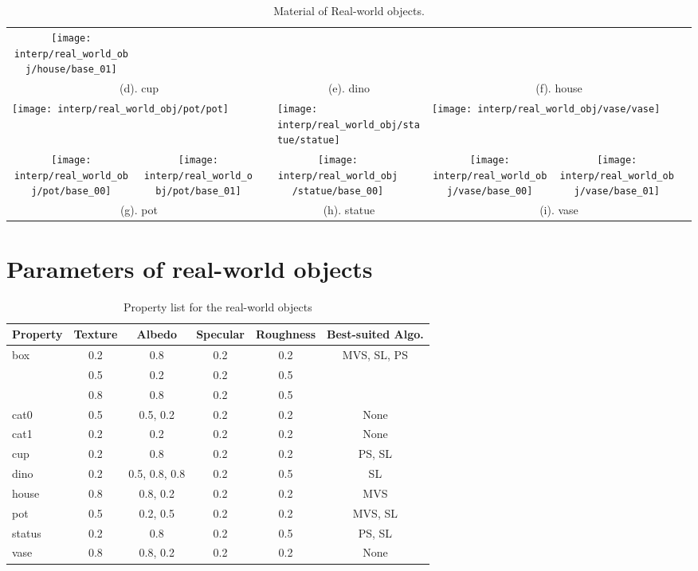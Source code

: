 \begin{table}[!hbtp]
\begin{tabular}{*{9}{c}}
  \texttt{[image: interp/real\_world\_obj/house/base\_01]} & \\
  \multicolumn{3}{c}{(d). cup} & \multicolumn{3}{c}{(e). dino} & \multicolumn{3}{c}{(f). house} \\
  \multicolumn{3}{l}{\texttt{[image: interp/real\_world\_obj/pot/pot]}} &
  \multicolumn{3}{l}{\texttt{[image: interp/real\_world\_obj/statue/statue]}} &
  \multicolumn{3}{l}{\texttt{[image: interp/real\_world\_obj/vase/vase]}}\\
  \texttt{[image: interp/real\_world\_obj/pot/base\_00]} &
  \texttt{[image: interp/real\_world\_obj/pot/base\_01]} & &
  \texttt{[image: interp/real\_world\_obj/statue/base\_00]} & & &
  \texttt{[image: interp/real\_world\_obj/vase/base\_00]} &
  \texttt{[image: interp/real\_world\_obj/vase/base\_01]}\\
  \multicolumn{3}{c}{(g). pot} & \multicolumn{3}{c}{(h). statue} & \multicolumn{3}{c}{(i). vase} \\
  \end{tabular}
  \caption{Material of Real-world objects.}
  \label{fig:real_data_material}
\end{table}

\section{Parameters of real-world objects}
\begin{table}[!htbp]
  \centering
  \begin{tabular}{l*{5}{c}}
  \hline
  \textbf{Property} & Texture & Albedo & Specular & Roughness & Best-suited Algo.\\
  \hline
  box & 0.2 & 0.8 & 0.2 & 0.2 & MVS, SL, PS\\
      & 0.5 & 0.2 & 0.2 & 0.5 & \\
      & 0.8 & 0.8 & 0.2 & 0.5 & \\
  cat0 & 0.5 & 0.5, 0.2 & 0.2 & 0.2 & None\\
  cat1 & 0.2 & 0.2 & 0.2 & 0.2 & None\\
  cup & 0.2 & 0.8 & 0.2 & 0.2 & PS, SL\\
  dino & 0.2 & 0.5, 0.8, 0.8 & 0.2 & 0.5 & SL\\
  house & 0.8 & 0.8, 0.2 & 0.2 & 0.2 & MVS\\
  pot & 0.5 & 0.2, 0.5 & 0.2 & 0.2 & MVS, SL\\
  status & 0.2 & 0.8 & 0.2 & 0.5 & PS, SL\\
  vase & 0.8 & 0.8, 0.2 & 0.2 & 0.2 & None\\
  \hline
  \end{tabular}
  \caption{Property list for the real-world objects}
  \label{tab:real_data_prop_list}
\end{table}

